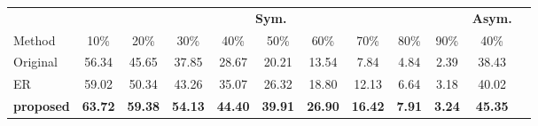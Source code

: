 \documentclass{article}
\begin{document}
\begin{table}[htbp]
\centering
\begin{tabular}{lccccccccccc}
\toprule
\multicolumn{1}{l}{} & \multicolumn{9}{c}{\textbf{Sym.}} & \multicolumn{1}{c}{\textbf{Asym.}} \\
\cmidrule(lr){2-10} \cmidrule(lr){11-11}
Method & 10\% & 20\% & 30\% & 40\% & 50\% & 60\% & 70\% & 80\% & 90\% & 40\% \\
\midrule
Original & 56.34 & 45.65 & 37.85 & 28.67 & 20.21 & 13.54 & 7.84 & 4.84 & 2.39 & 38.43 \\
ER       & 59.02 & 50.34 & 43.26 & 35.07 & 26.32 & 18.80 & 12.13 & 6.64 & 3.18 & 40.02 \\
\textbf{proposed} & \textbf{63.72} & \textbf{59.38} & \textbf{54.13} & \textbf{44.40} & \textbf{39.91} & \textbf{26.90} & \textbf{16.42} & \textbf{7.91} & \textbf{3.24} & \textbf{45.35} \\
\bottomrule
\end{tabular}
\end{table}
\end{document}
